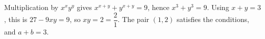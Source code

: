 Multiplication by $x^xy^y$ gives $x^{x+y}+y^{x+y}=9$, hence $x^3+y^3=9$. Using $x+y=3$, this is $27-9xy=9$, so $xy=2=\dfrac{2}{1}$. The pair $(1,2)$ satisfies the conditions, and $\boxed{a+b=3}$.
